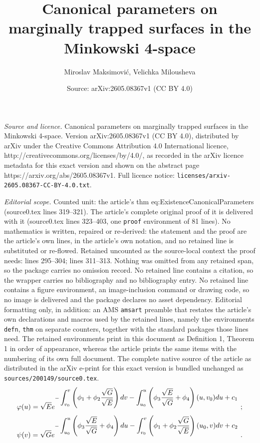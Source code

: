 \documentclass[10pt,a4paper]{amsart}
\title{Canonical parameters on marginally trapped surfaces in the Minkowski 4-space}
\author{Miroslav Maksimovi\'c, Velichka Milousheva}
\date{Source: arXiv:2605.08367v1 (CC BY 4.0)}
\newcommand{\ds}{\displaystyle}
\begin{document}
\maketitle

\noindent\emph{Source and licence.} Canonical parameters on marginally trapped surfaces in the Minkowski 4-space. Version arXiv:2605.08367v1 (CC BY 4.0), distributed by arXiv under the Creative Commons Attribution 4.0 International licence, http://creativecommons.org/licenses/by/4.0/, as recorded in the arXiv licence metadata for this exact version and shown on the abstract page https://arxiv.org/abs/2605.08367v1. Full licence notice: \texttt{licenses/arxiv-2605.08367-CC-BY-4.0.txt}.\par\smallskip

\noindent\textit{Editorial scope.} Counted unit: the article's thm eq:ExistenceCanonicalParameters (source0.tex lines 319--321). The article's complete original proof of it is delivered with it (source0.tex lines 323--403, one \texttt{proof} environment of 81 lines). No mathematics is written, repaired or re-derived: the statement and the proof are the article's own lines, in the article's own notation, and no retained line is substituted or re-flowed.  Retained uncounted as the source-local context the proof needs: lines 295--304; lines 311--313.  Nothing was omitted from any retained span, so the package carries no omission record.  No retained line contains a citation, so the wrapper carries no bibliography and no bibliography entry.  No retained line contains a figure environment, an image-inclusion command or drawing code, so no image is delivered and the package declares no asset dependency.  Editorial formatting only, in addition: an AMS \texttt{amsart} preamble that restates the article's own declarations and macros used by the retained lines, namely the environments \texttt{defn}, \texttt{thm} on separate counters, together with the standard packages those lines need.  The retained environments print in this document as Definition 1, Theorem 1 in order of appearance, whereas the article prints the same items with the numbering of its own full document.  The complete native source of the article as distributed in the arXiv e-print for this exact version is bundled unchanged as \texttt{sources/200149/source0.tex}.
\begin{equation} \label{eq:phi-psi}
	\begin{array}{l} 
		\vspace{2mm}
		\varphi(u) = \ds\sqrt Ee^{-\ds\int_{v_0}^v\left(\phi_1+\phi_2\frac{\sqrt G}{\sqrt E}\right)dv
			-\int_{u_0}^u\left(\phi_3\frac{\sqrt E}{\sqrt G}+\phi_4\right)(u,v_0)du+c_1}\ ;  \\
		\vspace{2mm}
		\psi(v) = \ds\sqrt Ge^{-\ds\int_{u_0}^u\left(\phi_3\frac{\sqrt E}{\sqrt G}+\phi_4\right)du
			-\int_{v_0}^v\left(\phi_1+\phi_2\frac{\sqrt G}{\sqrt E}\right)(u_0,v)dv+c_2} \ .
	\end{array}   
\end{equation}
\end{document}
